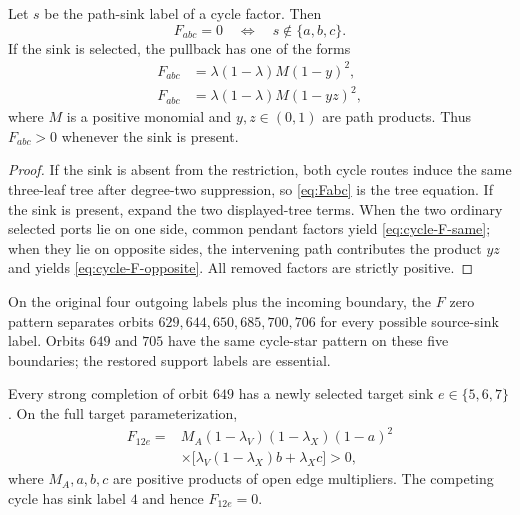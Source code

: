 \begin{lemma}\label{lem:cycle-star}
Let $s$ be the path-sink label of a cycle factor.  Then
\[
F_{abc}=0\quad\Longleftrightarrow\quad s\notin\{a,b,c\}.
\]
If the sink is selected, the pullback has one of the forms
\begin{align}
F_{abc}&=\lambda(1-\lambda)M(1-y)^2,\label{eq:cycle-F-same}\\
F_{abc}&=\lambda(1-\lambda)M(1-yz)^2,\label{eq:cycle-F-opposite}
\end{align}
where $M$ is a positive monomial and $y,z\in(0,1)$ are path products.  Thus $F_{abc}>0$ whenever the sink is present.
\end{lemma}

\begin{proof}
If the sink is absent from the restriction, both cycle routes induce the same three-leaf tree after degree-two suppression, so \eqref{eq:Fabc} is the tree equation.  If the sink is present, expand the two displayed-tree terms.  When the two ordinary selected ports lie on one side, common pendant factors yield \eqref{eq:cycle-F-same}; when they lie on opposite sides, the intervening path contributes the product $yz$ and yields \eqref{eq:cycle-F-opposite}.  All removed factors are strictly positive.
\end{proof}

On the original four outgoing labels plus the incoming boundary, the $F$ zero pattern separates orbits $629,644,650,685,700,706$ for every possible source-sink label.  Orbits $649$ and $705$ have the same cycle-star pattern on these five boundaries; the restored support labels are essential.



\begin{lemma}\label{lem:orbit649}
Every strong completion of orbit $649$ has a newly selected target sink $e\in\{5,6,7\}$.  On the full target parameterization,
\begin{equation}\label{eq:orbit649}
\begin{split}
F_{12e}={}&M_A(1-\lambda_V)(1-\lambda_X)(1-a)^2\\
&\times\bigl[\lambda_V(1-\lambda_X)b+\lambda_Xc\bigr]>0,
\end{split}
\end{equation}
where $M_A,a,b,c$ are positive products of open edge multipliers.  The competing cycle has sink label $4$ and hence $F_{12e}=0$.
\end{lemma}

